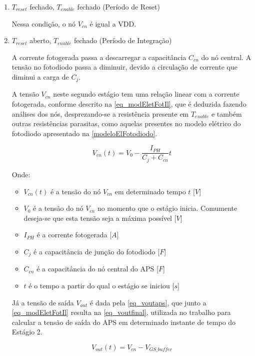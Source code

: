 \begin{enumerate}

\item $T_{reset}$ fechado, $T_{enable}$ fechado (Período de Reset)
    
Nessa condição, o n\'o $V_{cn}$ \'e igual a VDD.

\item $T_{reset}$ aberto, $T_{enable}$ fechado (Período de Integração)

A corrente fotogerada passa a descarregar a capacit\^ancia $C_{cn}$ do nó central. A tensão no fotodiodo passa a diminuir, devido a circulação de corrente que diminui a carga de $C_{j}$.

A tensão $V_{cn}$ neste segundo est\'agio tem uma relação linear com a corrente fotogerada, conforme descrito na \autoref{eq_modEletFotIl}, que \'e deduzida fazendo an\'alises dos n\'os, desprezando-se a resistência presente em $T_{enable}$ e também outras resistências parasitas, como aquelas presentes no modelo elétrico do fotodiodo apresentado na \autoref{modeloElFotodiodo}.

\begin{equation}
    \label{eq_modEletFotIl}
    V_{cn}(t) = V_0-\frac{I_{PH}}{C_j+C_{cn}}t
\end{equation}

Onde:

\begin{itemize}
    \item $V_{cn}(t)$ \'e a tensão do nó $V_{cn}$ em determinado tempo $t$ [$V$]
    \item $V_0$ \'e a tensão do nó $V_{cn}$ no momento que o estágio inicia. Comumente deseja-se que esta tensão seja a máxima possível [$V$]
    \item $I_{PH}$ \'e a corrente fotogerada [$A$]
    \item $C_j$ \'e a capacit\^ancia de junção do fotodiodo [$F$]
    \item $C_{cn}$ \'e a capacit\^ancia do n\'o central do APS [$F$]
    \item $t$ \'e o tempo a partir do qual o estágio se iniciou [$s$]
\end{itemize}

Já a tensão de saída $V_{out}$ é dada pela \autoref{eq_voutaps}, que junto a \autoref{eq_modEletFotIl} resulta na \autoref{eq_voutfinal}, utilizada no trabalho para calcular a tensão de saída do APS em determinado instante de tempo do Estágio 2.

\begin{equation}
    \label{eq_voutaps}
    V_{out}(t) = V_{cn} - V_{GS\_buffer}
\end{equation}


\end{enumerate}
